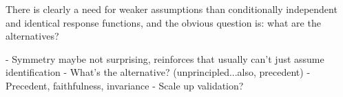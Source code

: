 There is clearly a need for weaker assumptions than conditionally independent and identical response functions, and the obvious question is: what are the alternatives? 


 - Symmetry maybe not surprising, reinforces that usually can't just assume identification
 - What's the alternative? (unprincipled...also, precedent)
 - Precedent, faithfulness, invariance
 - Scale up validation?